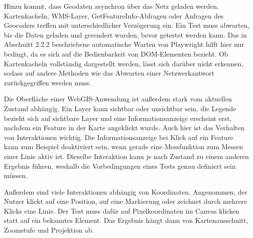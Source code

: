 Hinzu kommt, dass Geodaten asynchron über das Netz geladen werden. Kartenkacheln, \ac{WMS}-Layer, GetFeatureInfo-Abfragen oder Anfragen des Geocoders treffen mit unterschiedlicher Verzögerung ein. Ein Test muss abwarten, bis die Daten geladen und gerendert wurden, bevor getestet werden kann. Das in Abschnitt 2.2.2 beschriebene automatische Warten von Playwright hilft hier nur bedingt, da es sich auf die Bedienbarkeit von \ac{DOM}-Elementen bezieht. Ob Kartenkacheln vollständig dargestellt werden, lässt sich darüber nicht erkennen, sodass auf andere Methoden wie das Abwarten einer Netzwerkantwort zurückgegriffen werden muss.

Die Oberfläche einer WebGIS-Anwendung ist außerdem stark vom aktuellen Zustand abhängig. Ein Layer kann sichtbar oder unsichtbar sein, die Legende bezieht sich auf sichtbare Layer und eine Informationsanzeige erscheint erst, nachdem ein Feature in der Karte angeklickt wurde. Auch hier ist das Verhalten von Interaktionen wichtig. Die Informationsanzeige bei Klick auf ein Feature kann zum Beispiel deaktiviert sein, wenn gerade eine Messfunktion zum Messen einer Linie aktiv ist. Dieselbe Interaktion kann je nach Zustand zu einem anderen Ergebnis führen, weshalb die Vorbedingungen eines Tests genau definiert sein müssen.

Außerdem sind viele Interaktionen abhängig von Koordinaten. Angenommen, der Nutzer klickt auf eine Position, auf eine Markierung oder zeichnet durch mehrere Klicks eine Linie. Der Test muss dafür auf Pixelkoordinaten im Canvas klicken statt auf ein bekanntes Element. Das Ergebnis hängt dann von Kartenausschnitt, Zoomstufe und Projektion ab.
